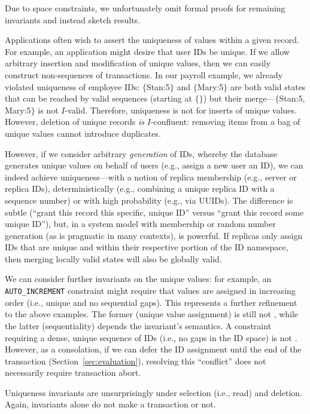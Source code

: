 Due to space constraints, we unfortunately omit formal proofs for
remaining invariants and instead sketch \iconfluence results.

 Applications often wish to assert the uniqueness
of values within a given record. For example, an application might
desire that user IDs be unique. If we allow arbitrary insertion and
modification of unique values, then we can easily construct
non-\iconfluent sequences of transactions. In our payroll example, we
already violated uniqueness of employee IDs: $\{$Stan:5$\}$ and
$\{$Mary:5$\}$ are both valid states that can be reached by valid
sequences (starting at $\{\}$) but their merge---$\{$Stan:5,
Mary:5$\}$ is not $I$-valid. Therefore, uniqueness is not \iconfluent
for inserts of unique values. However, deletion of unique records
\textit{is} $I$-confluent: removing items from a bag of unique values
cannot introduce duplicates.

However, if we consider arbitrary \textit{generation} of IDs, whereby
the database generates unique values on behalf of users (e.g., assign
a new user an ID), we can indeed achieve uniqueness---with a notion of
replica membership (e.g., server or replica IDs), deterministically
(e.g., combining a unique replica ID with a sequence number) or with
high probability (e.g., via UUIDs). The difference is subtle (``grant
this record this specific, unique ID'' versus ``grant this record some
unique ID''), but, in a system model with membership or random number
generation (as is pragmatic in many contexts), is powerful. If
replicas only assign IDs that are unique and within their respective
portion of the ID namespace, then merging locally valid states will
also be globally valid.

We can consider further invariants on the unique values: for example,
an \texttt{AUTO\_INCREMENT} constraint might require that values are
assigned in increasing order (i.e., unique and no sequential
gaps). This represents a further refinement to the above examples. The
former (unique value assignment) is still not \iconfluent, while the
latter (sequentiality) depends the invariant's semantics. A constraint
requiring a dense, unique sequence of IDs (i.e., no gaps in the ID
space) is not \iconfluent. However, as a consolation, if we can defer
the ID assignment until the end of the transaction
(Section~\ref{sec:evaluation}), resolving this ``conflict'' does not
necessarily require transaction abort.

Uniqueness invariants are unsurprisingly \iconfluent under selection
(i.e., read) and deletion. Again, invariants alone do not make a
transaction \cfree or not.

